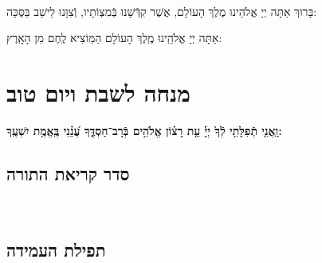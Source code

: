 \documentclass[twoside, openany, parskip=half, 11pt]{book}
\begin{document}
\begin{sometimes}

\\
בָּרוּךְ אַתָּה יְיָ אֱלֹהֵינוּ מֶלֶךְ הָעוֹלָם, אֲשֶׁר קִדְּֿשָׁנוּ בְּֿמִצְוֹתָיו, וְֿצִוָּנוּ לֵישֵׁב בַּסֻּכָּה:

\end{sometimes}

אַתָּה יְיָ אֱלֹהֵֽינוּ מֶֽלֶךְ הָעוֹלָם הַמּֽוֹצִיא לֶֽחֶם מִן הָאָֽרֶץ:



\chapter[מנחה לשבת ויום טוב]{ מנחה לשבת ויום טוב }

\ashrei

\uvaletzion

\halfkaddish


\textbf{וַֽאֲנִ֤י תְֿפִלָּתִ֥י לְֿךָ֙ יְיָ֡ עֵ֤ת רָצ֗וֹן אֱלֹהִ֥ים בְּֿרָב־חַסְדֶּ֑ךָ עֲ֝נֵ֗נִי בֶּֽאֱמֶ֥ת יִשְׁעֶֽךָ:} 


\section*{ סדר קריאת התורה }


\pesicha

\gadlu

\avharachamim

\vesigale


\torahbarachu

\hagomel

\nextpage
\hagbaha

\galila

\yehalelu

\\
\kafdalet

\nextpage
\etzchaim


\halfkaddish


\section*{ תפילת העמידה }
\end{document}
